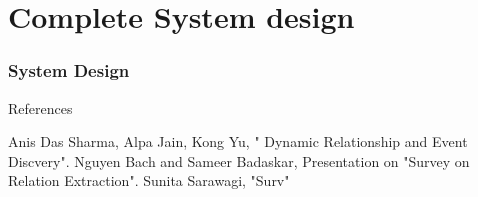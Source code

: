 \documentclass[10pt]{beamer}
\begin{document}



\section{Complete System design}

\begin{frame}
\frametitle{System Design}


\end{frame}





\begin{frame}{References}
  \begin{thebibliography}{99}
Anis Das Sharma, Alpa Jain, Kong Yu, " Dynamic Relationship and Event Discvery".
Nguyen Bach and Sameer Badaskar, Presentation on "Survey on Relation Extraction".
Sunita Sarawagi, "Surv"

\end{thebibliography}
\end{frame}

\begin{frame}
\Large
\begin{center}
\end{center}
\end{frame}
\end{document}

